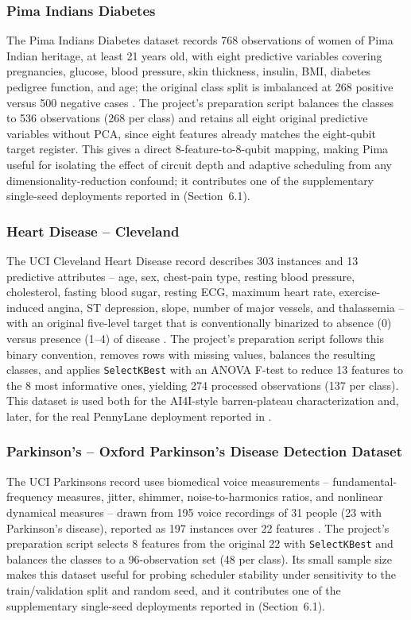 \FloatBarrier
\subsubsection{Pima Indians Diabetes}
The Pima Indians Diabetes dataset records 768 observations of women of Pima Indian heritage, at least 21 years old, with eight predictive variables covering pregnancies, glucose, blood pressure, skin thickness, insulin, BMI, diabetes pedigree function, and age; the original class split is imbalanced at 268 positive versus 500 negative cases \citep{smith1988pima}. The project's preparation script balances the classes to 536 observations (268 per class) and retains all eight original predictive variables without PCA, since eight features already matches the eight-qubit target register. This gives a direct 8-feature-to-8-qubit mapping, making Pima useful for isolating the effect of circuit depth and adaptive scheduling from any dimensionality-reduction confound; it contributes one of the supplementary single-seed deployments reported in  (Section~6.1).

\subsubsection{Heart Disease -- Cleveland}
The UCI Cleveland Heart Disease record describes 303 instances and 13 predictive attributes -- age, sex, chest-pain type, resting blood pressure, cholesterol, fasting blood sugar, resting ECG, maximum heart rate, exercise-induced angina, ST depression, slope, number of major vessels, and thalassemia -- with an original five-level target that is conventionally binarized to absence (0) versus presence (1--4) of disease \citep{detrano1989heart}. The project's preparation script follows this binary convention, removes rows with missing values, balances the resulting classes, and applies \texttt{SelectKBest} with an ANOVA F-test to reduce 13 features to the 8 most informative ones, yielding 274 processed observations (137 per class). This dataset is used both for the AI4I-style barren-plateau characterization and, later, for the real PennyLane deployment reported in .

\subsubsection{Parkinson's -- Oxford Parkinson's Disease Detection Dataset}
The UCI Parkinsons record uses biomedical voice measurements -- fundamental-frequency measures, jitter, shimmer, noise-to-harmonics ratios, and nonlinear dynamical measures -- drawn from 195 voice recordings of 31 people (23 with Parkinson's disease), reported as 197 instances over 22 features \citep{little2007parkinsons}. The project's preparation script selects 8 features from the original 22 with \texttt{SelectKBest} and balances the classes to a 96-observation set (48 per class). Its small sample size makes this dataset useful for probing scheduler stability under sensitivity to the train/validation split and random seed, and it contributes one of the supplementary single-seed deployments reported in  (Section~6.1).


